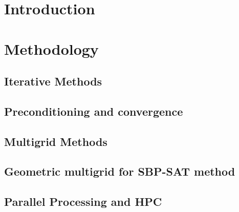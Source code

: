 \chapter{Introduction}


\chapter{Methodology}


\section{Iterative Methods}

\section{Preconditioning and convergence}

\section{Multigrid Methods}

\section{Geometric multigrid for SBP-SAT method}

\section{Parallel Processing and HPC}



